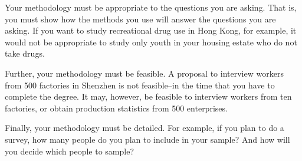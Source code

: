 \documentclass[draftclsnofoot,journal,onecolumn,12pt]{IEEEtran}
\begin{document}
Your methodology must be  appropriate  to the questions you are asking. That is, you must show how the
methods you use will answer the questions you are asking. If you want to study recreational drug use in Hong
Kong, for example, it would not be appropriate to study only youth in your housing estate who do not take drugs.

Further, your methodology must be feasible. A proposal to interview workers from 500 factories in Shenzhen is
not feasible--in the time that you have to complete the degree. It may, however, be feasible to interview workers
from ten factories, or obtain production statistics from 500 enterprises.

Finally, your methodology must be detailed. For example, if you plan to do a survey, how many people do you
plan to include in your sample? And how will you decide which people to sample?
%
\nocite{*}

\renewcommand\refname{References}


\end{document}
